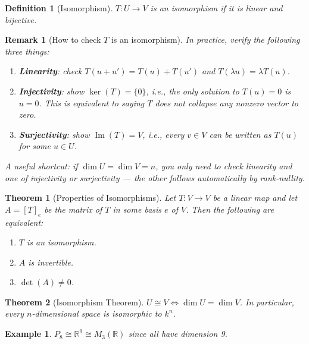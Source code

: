 \documentclass{article}
\newtheorem{theorem}{Theorem}
\newtheorem{definition}{Definition}
\newtheorem*{example}{Example}
\newtheorem{remark}{Remark}
\begin{document}
\begin{definition}[Isomorphism]
    $T: U\to V$ is an isomorphism if it is linear and bijective.
\end{definition}
\begin{remark}[How to check $T$ is an isomorphism]
    In practice, verify the following three things:
    \begin{enumerate}
        \item \textbf{Linearity}: check $T(u+u')=T(u)+T(u')$ and $T(\lambda u)=\lambda T(u)$.
        \item \textbf{Injectivity}: show $\ker(T)=\{0\}$, i.e., the only solution to $T(u)=0$ is $u=0$. This is equivalent to saying $T$ does not collapse any nonzero vector to zero.
        \item \textbf{Surjectivity}: show $\operatorname{Im}(T)=V$, i.e., every $v\in V$ can be written as $T(u)$ for some $u\in U$.
    \end{enumerate}
    A useful shortcut: if $\dim U = \dim V = n$, you only need to check linearity and \emph{one} of injectivity or surjectivity --- the other follows automatically by rank-nullity.
\end{remark}
\begin{theorem}[Properties of Isomorphisms]
    Let $T: V\to V$ be a linear map and let $A = [T]_e$ be the matrix of $T$ in some basis $e$ of $V$. Then the following are equivalent:
    \begin{enumerate}
        \item $T$ is an isomorphism.
        \item $A$ is invertible.
        \item $\det(A)\neq0$.
    \end{enumerate}
\end{theorem}
\begin{theorem}[Isomorphism Theorem]
    $U\cong V \iff \dim U = \dim V$. In particular, every $n$-dimensional space is isomorphic to $k^n$.
\end{theorem}
\begin{example}
    $P_8\cong\mathbb{R}^9\cong M_3(\mathbb{R})$ since all have dimension 9.
\end{example}
\end{document}
